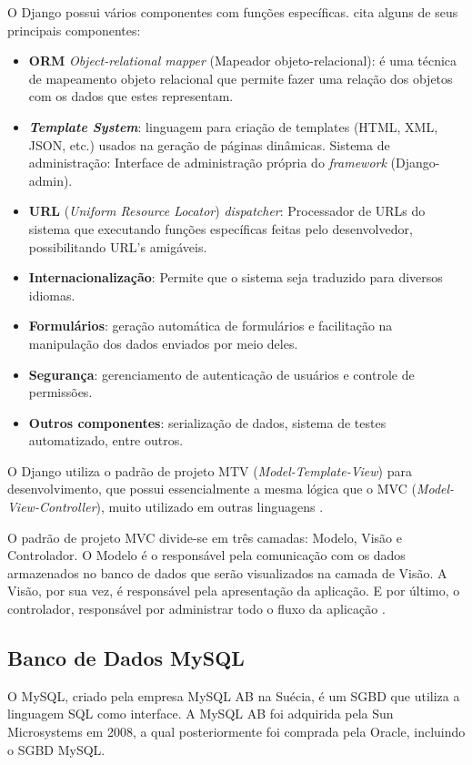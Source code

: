 \documentclass[
	12pt,				%
    oneside,			%
	a4paper,			%
	english,			%
	french,				%
	spanish,			%
	brazil,				%
	]{abntex2}
\begin{document}
O Django possui vários componentes com funções específicas. 
cita alguns de seus principais componentes:

 \begin{itemize}

	\item \textbf{ORM} \textit{\textit{Object-relational mapper}} (Mapeador objeto-relacional): é
uma técnica de mapeamento objeto relacional que permite fazer uma
relação dos objetos com os dados que estes representam.
	\item \textbf{\textit{Template System}}: linguagem para criação de templates (HTML, XML,
JSON, etc.) usados na geração de páginas dinâmicas.
Sistema de administração: Interface de administração própria do
\textit{framework} (Django-admin).
	\item \textbf{URL} (\textit{Uniform Resource Locator}) \textit{dispatcher}: Processador de URLs
do sistema que executando funções específicas feitas pelo
desenvolvedor, possibilitando URL’s amigáveis.
	\item \textbf{Internacionalização}: Permite que o sistema seja traduzido para
diversos idiomas.
	\item \textbf{Formulários}: geração automática de formulários e facilitação na
manipulação dos dados enviados por meio deles.
	\item \textbf{Segurança}: gerenciamento de autenticação de usuários e controle de
permissões.
	\item \textbf{Outros componentes}: serialização de dados, sistema de testes
automatizado, entre outros.

\end{itemize}

O Django utiliza o padrão de projeto MTV (\textit{Model-Template-View}) para
desenvolvimento, que possui essencialmente a mesma lógica que o MVC (\textit{Model-View-Controller}),
muito utilizado em outras linguagens \cite{neto}.

O padrão de projeto MVC divide-se em três camadas: Modelo, Visão e
Controlador. O Modelo é o responsável pela comunicação com os dados
armazenados no banco de dados que serão visualizados na camada de Visão. A
Visão, por sua vez, é responsável pela apresentação da aplicação. E por último, o
controlador, responsável por administrar todo o fluxo da aplicação \cite{lemos}.


\subsection{Banco de Dados MySQL}
O MySQL, criado pela empresa MySQL AB na Suécia, é um SGBD que utiliza a
linguagem SQL como interface. A MySQL AB foi adquirida pela Sun Microsystems em
2008, a qual posteriormente foi comprada pela Oracle, incluindo o SGBD MySQL.
\end{document}
